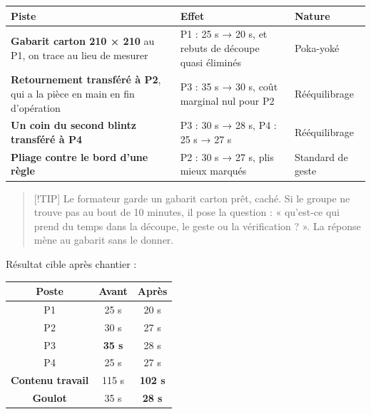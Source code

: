 \documentclass[
]{article}
\newcounter{none} %
\begin{document}
{\def\LTcaptype{none} %
\begin{longtable}[]{@{}
  >{\raggedright\arraybackslash}p{}
  >{\raggedright\arraybackslash}p{}
  >{\raggedright\arraybackslash}p{}@{}}
\toprule\noalign{}
\begin{minipage}[b]{\linewidth}\raggedright
Piste
\end{minipage} & \begin{minipage}[b]{\linewidth}\raggedright
Effet
\end{minipage} & \begin{minipage}[b]{\linewidth}\raggedright
Nature
\end{minipage} \\
\midrule\noalign{}
\endhead
\bottomrule\noalign{}
\endlastfoot
\textbf{Gabarit carton 210 × 210} au P1, on trace au lieu de mesurer &
P1 : 25 s → 20 s, et rebuts de découpe quasi éliminés & Poka-yoké \\
\textbf{Retournement transféré à P2}, qui a la pièce en main en fin
d'opération & P3 : 35 s → 30 s, coût marginal nul pour P2 &
Rééquilibrage \\
\textbf{Un coin du second blintz transféré à P4} & P3 : 30 s → 28 s, P4
: 25 s → 27 s & Rééquilibrage \\
\textbf{Pliage contre le bord d'une règle} & P2 : 30 s → 27 s, plis
mieux marqués & Standard de geste \\
\end{longtable}
}

\begin{quote}
{[}!TIP{]} Le formateur garde un gabarit carton prêt, caché. Si le
groupe ne trouve pas au bout de 10 minutes, il pose la question : «
qu'est-ce qui prend du temps dans la découpe, le geste ou la
vérification ? ». La réponse mène au gabarit sans le donner.
\end{quote}

Résultat cible après chantier :

{\def\LTcaptype{none} %
\begin{longtable}[]{@{}ccc@{}}
\toprule\noalign{}
Poste & Avant & Après \\
\midrule\noalign{}
\endhead
\bottomrule\noalign{}
\endlastfoot
P1 & 25 s & 20 s \\
P2 & 30 s & 27 s \\
P3 & \textbf{35 s} & 28 s \\
P4 & 25 s & 27 s \\
\textbf{Contenu travail} & 115 s & \textbf{102 s} \\
\textbf{Goulot} & 35 s & \textbf{28 s} \\
\end{longtable}
}
\end{document}
